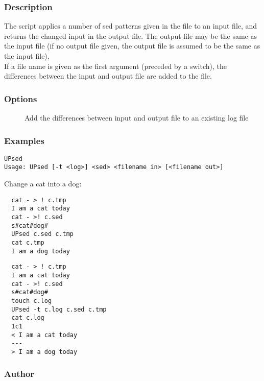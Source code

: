 \subsubsection*{Description}

\noindent
The  script applies a number of sed patterns given in the
 file to an input file, and returns the changed input in the output
file. The output file may be the same as the input file (if no output file
given, the output file is assumed to be the same as the input file).\\
If a  file name is given as the first argument (preceded by a
 switch), the differences between the input and output file are added
to the  file.

\subsubsection*{Options}

\begin{description}
\item[]
    Add the differences between input and output file to an existing log file
\end{description}

\subsubsection*{Examples}

\begin{verbatim}
UPsed
Usage: UPsed [-t <log>] <sed> <filename in> [<filename out>]
\end{verbatim}

\noindent
Change a cat into a dog:

\begin{verbatim}
  cat - > ! c.tmp
  I am a cat today
  cat - >! c.sed
  s#cat#dog#
  UPsed c.sed c.tmp
  cat c.tmp
  I am a dog today
  \end{verbatim}

\begin{verbatim}
  cat - > ! c.tmp
  I am a cat today
  cat - >! c.sed
  s#cat#dog#
  touch c.log
  UPsed -t c.log c.sed c.tmp
  cat c.log
  1c1
  < I am a cat today
  ---
  > I am a dog today
\end{verbatim}

\subsubsection*{Author}

